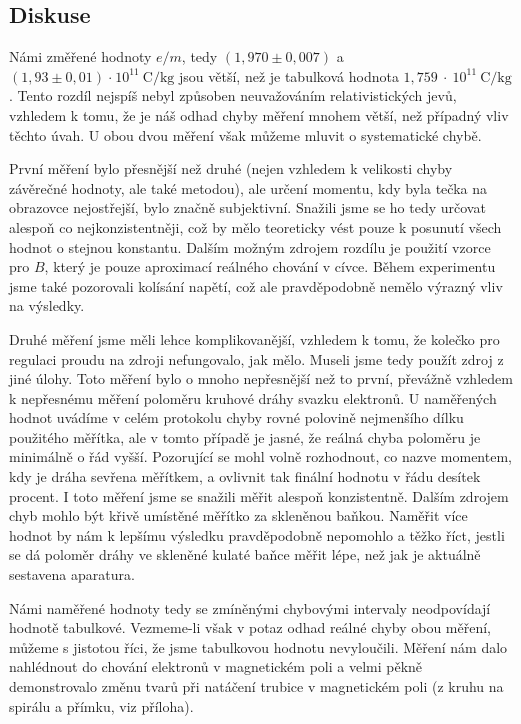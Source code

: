 \documentclass[english]{article}
\begin{document}
	\subsection{Diskuse}
		Námi změřené hodnoty $e/m$, tedy $(1,970\pm0,007)$ a $(1,93\pm0,01)~\mathrm{\cdot~10^{11}~C/kg}$ jsou větší, než je tabulková \cite{bib:tabulky} hodnota $1,759~\cdot~10^{11}~\mathrm{C/kg}$. Tento rozdíl nejspíš nebyl způsoben neuvažováním relativistických jevů, vzhledem k tomu, že je náš odhad chyby měření mnohem větší, než případný vliv těchto úvah. U obou dvou měření však můžeme mluvit o systematické chybě. 
		
		První měření bylo přesnější než druhé (nejen vzhledem k velikosti chyby závěrečné hodnoty, ale také metodou), ale určení momentu, kdy byla tečka na obrazovce nejostřejší, bylo značně subjektivní. Snažili jsme se ho tedy určovat alespoň co nejkonzistentněji, což by mělo teoreticky vést pouze k posunutí všech hodnot o stejnou konstantu. Dalším možným zdrojem rozdílu je použití vzorce pro $B$, který je pouze aproximací reálného chování v cívce. Během experimentu jsme také pozorovali kolísání napětí, což ale pravděpodobně nemělo výrazný vliv na výsledky.
		
		Druhé měření jsme měli lehce komplikovanější, vzhledem k tomu, že kolečko pro regulaci proudu na zdroji nefungovalo, jak mělo. Museli jsme tedy použít zdroj z jiné úlohy. Toto měření bylo o mnoho nepřesnější než to první, převážně vzhledem k nepřesnému měření poloměru kruhové dráhy svazku elektronů. U naměřených hodnot uvádíme v celém protokolu chyby rovné polovině nejmenšího dílku použitého měřítka, ale v tomto případě je jasné, že reálná chyba poloměru je minimálně o řád vyšší. Pozorující se mohl volně rozhodnout, co nazve momentem, kdy je dráha sevřena měřítkem, a ovlivnit tak finální hodnotu v řádu desítek procent. I toto měření jsme se snažili měřit alespoň konzistentně. Dalším zdrojem chyb mohlo být křivě umístěné měřítko za skleněnou baňkou. Naměřit více hodnot by nám k lepšímu výsledku pravděpodobně nepomohlo a těžko říct, jestli se dá poloměr dráhy ve skleněné kulaté baňce měřit lépe, než jak je aktuálně sestavena aparatura. 
		
		Námi naměřené hodnoty tedy se zmíněnými chybovými intervaly neodpovídají hodnotě tabulkové. Vezmeme-li však v potaz odhad reálné chyby obou měření, můžeme s jistotou říci, že jsme tabulkovou hodnotu nevyloučili. Měření nám dalo nahlédnout do chování elektronů v magnetickém poli a velmi pěkně demonstrovalo změnu tvarů při natáčení trubice v magnetickém poli (z kruhu na spirálu a přímku, viz příloha).
		
\end{document}

